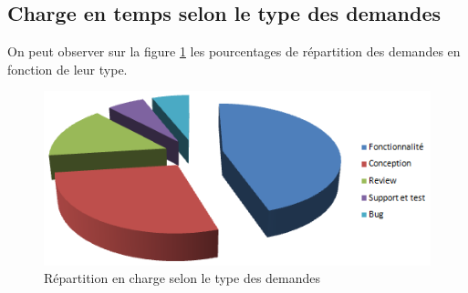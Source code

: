 \subsection{Charge en temps selon le type des demandes}
On peut observer sur la figure \ref{fig:pie} les pourcentages de répartition des demandes en fonction de leur type.
\begin{figure}[H]
  \centering
    \includegraphics[width=15cm]{figures/pie}
  \caption{\label{fig:pie}Répartition en charge selon le type des demandes}
\end{figure}
